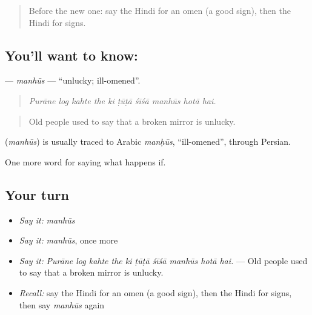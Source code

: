 \label{lesson:HI-C546-manhus}



\begin{quote}
Before the new one: say the Hindi for an omen (a good sign), then the Hindi for signs.
\end{quote}

\subsection*{You'll want to know: }
\textbf{} — \emph{manhūs} — \textquotedblleft{}unlucky; ill-omened\textquotedblright{}.

\begin{quote}
         
\end{quote}

\begin{quote}
\emph{Purāne log kahte the ki ṭūṭā śīśā manhūs hotā hai.}
\end{quote}

\begin{quote}
Old people used to say that a broken mirror is unlucky.
\end{quote}

\begin{cousinweb}
\textbf{} (\emph{manhūs}) is usually traced to Arabic \emph{manḥūs}, \textquotedblleft{}ill-omened\textquotedblright{}, through Persian.
\end{cousinweb}

\begin{grammarlens}[title={What you've built}]
One more word for saying what happens if.
\end{grammarlens}

\subsection*{Your turn}
\begin{itemize}
\raggedright
  \item \emph{Say it:} \emph{manhūs}
  \item \emph{Say it:} \emph{manhūs}, once more
  \item \emph{Say it:} \emph{Purāne log kahte the ki ṭūṭā śīśā manhūs hotā hai.} — Old people used to say that a broken mirror is unlucky.
  \item \emph{Recall:} say the Hindi for an omen (a good sign), then the Hindi for signs, then say \emph{manhūs} again
\end{itemize}

